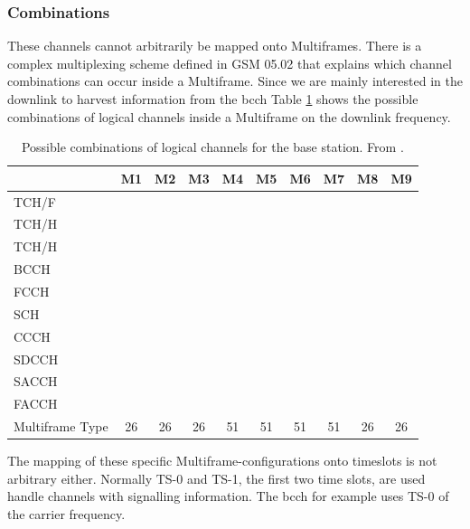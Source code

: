 \subsubsection{Combinations}
These channels cannot arbitrarily be mapped onto Multiframes.
There is a complex multiplexing scheme defined in GSM 05.02 \cite{gsm0502} that explains which channel combinations can occur inside a Multiframe.
Since we are mainly interested in the downlink to harvest information from the \gls{bcch} Table \ref{tab:channel_configurations} shows the possible combinations of logical channels inside a  Multiframe on the downlink frequency.
\begin{table}
	\centering
	\begin{tabular}{lccccccccc}
	\toprule
						&M1&M2&M3&M4&M5&M6&M7&M8&M9\\
	\midrule
	TCH/F				&\cellcolor[gray]{0.7}&&&&&&&\cellcolor[gray]{0.7}&\cellcolor[gray]{0.7}\\
	TCH/H				&&\cellcolor[gray]{0.7}&\cellcolor[gray]{0.7}&&&&&&\\
	TCH/H				&&&\cellcolor[gray]{0.7}&&&&&&\\
	BCCH				&&&&\cellcolor[gray]{0.7}&\cellcolor[gray]{0.7}&\cellcolor[gray]{0.7}&&&\\
	FCCH				&&&&\cellcolor[gray]{0.7}&\cellcolor[gray]{0.7}&&&&\\
	SCH					&&&&\cellcolor[gray]{0.7}&\cellcolor[gray]{0.7}&&&&\\
	CCCH				&&&&\cellcolor[gray]{0.7}&\cellcolor[gray]{0.7}&\cellcolor[gray]{0.7}&&&\\
	SDCCH				&&&&&\cellcolor[gray]{0.7}&&\cellcolor[gray]{0.7}&&\\
	SACCH				&\cellcolor[gray]{0.7}&\cellcolor[gray]{0.7}&\cellcolor[gray]{0.7}&&\cellcolor[gray]{0.7}&&\cellcolor[gray]{0.7}&\cellcolor[gray]{0.7}&\cellcolor[gray]{0.7}\\
	FACCH				&\cellcolor[gray]{0.7}&\cellcolor[gray]{0.7}&\cellcolor[gray]{0.7}&&&&&\cellcolor[gray]{0.7}&\\
	\midrule
	Multiframe Type		&26&26&26&51&51&51&51&26&26\\
	\bottomrule
	\end{tabular}
	\caption{Possible combinations of logical channels for the base station. From \cite{GSM2009}.}
	\label{tab:channel_configurations}
\end{table}
The mapping of these specific Multiframe-configurations onto timeslots is not arbitrary either.
Normally TS-0 and TS-1, the first two time slots, are used handle channels with signalling information.
The \gls{bcch} for example uses TS-0 of the carrier frequency.

